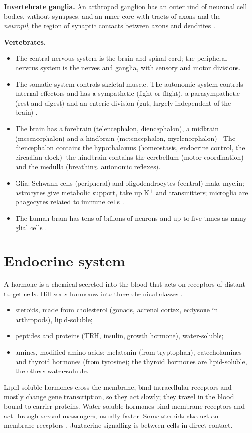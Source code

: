 \textbf{Invertebrate ganglia.}
An arthropod ganglion has an outer rind of
neuronal cell bodies, without synapses,
and an inner core with tracts of axons
and the \emph{neuropil}, the region of
synaptic contacts between axons and
dendrites \cite[Chapter
15]{hill2012animal}.

\textbf{Vertebrates.}
\begin{itemize}
\item The central nervous system is the
brain and spinal cord; the peripheral
nervous system is the nerves and
ganglia, with sensory and motor
divisions.
\item The somatic system controls
skeletal muscle. The autonomic system
controls internal effectors and has a
sympathetic (fight or flight), a
parasympathetic (rest and digest) and an
enteric division (gut, largely
independent of the brain)
\cite[Chapter 15]{hill2012animal}.
\item The brain has a forebrain
(telencephalon, diencephalon), a midbrain
(mesencephalon) and a hindbrain
(metencephalon, myelencephalon)
\cite[Chapter 15]{hill2012animal}. The
diencephalon contains the hypothalamus
(homeostasis, endocrine control, the
circadian clock); the hindbrain
contains the cerebellum (motor
coordination) and the medulla
(breathing, autonomic reflexes).
\item Glia: Schwann cells (peripheral)
and oligodendrocytes (central) make
myelin; astrocytes give metabolic
support, take up K$^+$ and
transmitters; microglia are phagocytes
related to immune cells
\cite[Chapter 12]{hill2012animal}.
\item The human brain has tens of
billions of neurons and up to five
times as many glial cells
\cite[Section
9.2.1]{willmer2005environmental}.
\end{itemize}

\section{Endocrine system}
\label{section-endocrine}

A hormone is a chemical secreted into the
blood that acts on receptors of distant
target cells. Hill sorts hormones into
three chemical classes
\cite[Chapter 16]{hill2012animal}:
\begin{itemize}
\item steroids, made from cholesterol
(gonads, adrenal cortex, ecdysone in
arthropods), lipid-soluble;
\item peptides and proteins (TRH,
insulin, growth hormone), water-soluble;
\item amines, modified amino acids:
melatonin (from tryptophan),
catecholamines and thyroid hormones
(from tyrosine); the thyroid hormones are
lipid-soluble, the others water-soluble.
\end{itemize}
Lipid-soluble hormones cross the membrane,
bind intracellular receptors and mostly
change gene transcription, so they act
slowly; they travel in the blood bound to
carrier proteins. Water-soluble hormones
bind membrane receptors and act through
second messengers, usually faster. Some
steroids also act on membrane receptors
\cite[Chapter 16]{hill2012animal}.
Juxtacrine signalling is between cells in
direct contact.

